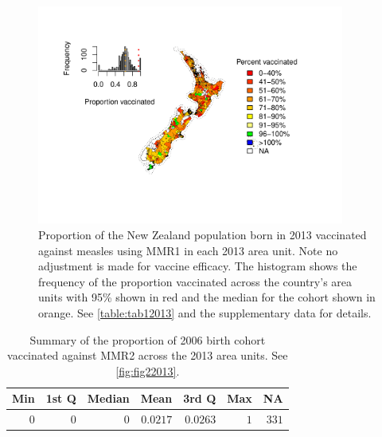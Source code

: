 \documentclass{article}
\begin{document}
\begin{figure}
\begin{center}
    \includegraphics[width=0.9\textwidth]{nir_census_MMR1_NIR_2013.pdf}
 \end{center}
    \caption{Proportion of the New Zealand population born in 2013 vaccinated against measles using MMR1 in each 2013 area unit. Note no adjustment is made for vaccine efficacy. The histogram shows the frequency of the proportion vaccinated across the country's area units with 95\% shown in red and the median for the cohort shown in orange. See \autoref{table:tab12013} and the supplementary data for details.}
\label{fig:fig12013}
\end{figure}

 \vspace{5mm} %
\begin{table}
\begin{center}
\begin{tabular}{rrrrrrr}
\hline\hline
\multicolumn{1}{c}{Min}&\multicolumn{1}{c}{1st Q}&\multicolumn{1}{c}{Median}&\multicolumn{1}{c}{Mean}&\multicolumn{1}{c}{3rd Q}&\multicolumn{1}{c}{Max}&\multicolumn{1}{c}{NA}\tabularnewline
\hline
$0$&$0$&$0$&$0.0217$&$0.0263$&$1$&$331$\tabularnewline
\hline
\end{tabular}\end{center}\caption{Summary of the proportion of 2006 birth cohort vaccinated against MMR2 across the 2013 area units. See \autoref{fig:fig22013}.}
\label{table:tab22013}
\end{table}
\end{document}
